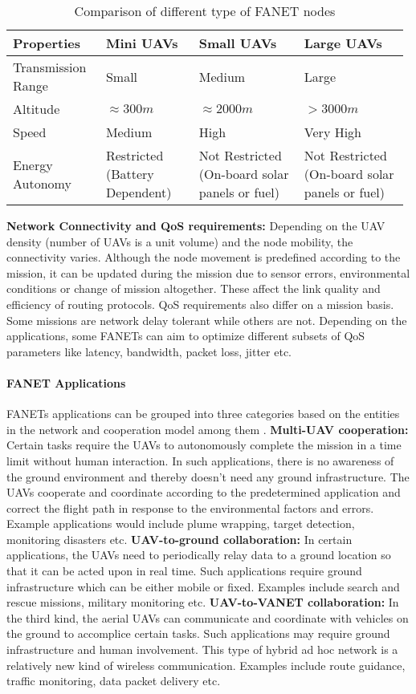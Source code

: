 \begin{table}
\caption{Comparison of different type of FANET nodes}
\label{tab:uav_comparison}
\begin{tabular}{|p{0.23\linewidth}|p{0.23\linewidth}|p{0.26\linewidth}|p{0.26\linewidth}|}
\toprule
Properties & Mini UAVs & Small UAVs & Large UAVs\\
\midrule
Transmission Range & Small & Medium & Large\\
\midrule
Altitude 	& $ \approx 300 m$ & $ \approx 2000 m$ & $> 3000 m$ \\
\midrule
Speed & Medium & High & Very High \\
\midrule
Energy Autonomy & Restricted (Battery Dependent) & Not Restricted (On-board solar panels or fuel) &  Not Restricted (On-board solar panels or fuel) \\
\bottomrule
\end{tabular}
\end{table}

\textbf{Network Connectivity and QoS requirements:} Depending on the UAV density (number of UAVs is a unit volume) and the node mobility, the connectivity varies. Although the node movement is predefined according to the mission, it can be updated during the mission due to sensor errors, environmental conditions or change of mission altogether. These affect the link quality and efficiency of routing protocols. QoS requirements also differ on a mission basis. Some missions are network delay tolerant while others are not. Depending on the applications, some FANETs can aim to optimize different subsets of QoS parameters like latency, bandwidth, packet loss, jitter etc.

\paragraph{FANET Applications}
FANETs applications can be grouped into three categories based on the entities in the network and cooperation model among them \cite{BEKMEZCI20131254}.
\textbf{Multi-UAV cooperation:} Certain tasks require the UAVs to autonomously complete the mission in a time limit without human interaction. In such applications, there is no awareness of the ground environment and thereby doesn't need any ground infrastructure. The UAVs cooperate and coordinate according to the predetermined application and correct the flight path in response to the environmental factors and errors. Example applications would include plume wrapping, target detection, monitoring disasters etc.
\textbf{UAV-to-ground collaboration:} In certain applications, the UAVs need to periodically relay data to a ground location so that it can be acted upon in real time. Such applications require ground infrastructure which can be either mobile or fixed. Examples include search and rescue missions, military monitoring etc.
\textbf{UAV-to-VANET collaboration:} In the third kind, the aerial UAVs can communicate and coordinate with vehicles on the ground to accomplice certain tasks. Such applications may require ground infrastructure and human involvement. This type of hybrid ad hoc network is a relatively new kind of wireless communication. Examples include route guidance, traffic monitoring, data packet delivery etc.

